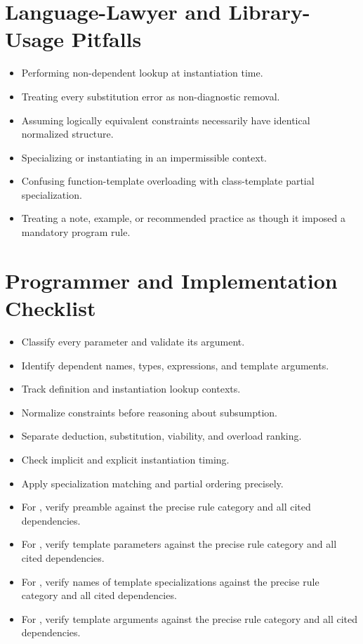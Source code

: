 \documentclass[11pt,letterpaper]{article}
\begin{document}
\section{Language-Lawyer and Library-Usage Pitfalls}
\begin{CornellReferencePitfallBox}\begin{itemize}[label=\textcolor{CornellReferenceAmber}{$\blacktriangleright$}]
\item Performing non-dependent lookup at instantiation time.
\item Treating every substitution error as non-diagnostic removal.
\item Assuming logically equivalent constraints necessarily have identical normalized structure.
\item Specializing or instantiating in an impermissible context.
\item Confusing function-template overloading with class-template partial specialization.
\item Treating a note, example, or recommended practice as though it imposed a mandatory program rule.
\end{itemize}\end{CornellReferencePitfallBox}
\section{Programmer and Implementation Checklist}
\begin{CornellReferenceChecklistBox}\begin{itemize}[label=$\square$]
\item Classify every parameter and validate its argument.
\item Identify dependent names, types, expressions, and template arguments.
\item Track definition and instantiation lookup contexts.
\item Normalize constraints before reasoning about subsumption.
\item Separate deduction, substitution, viability, and overload ranking.
\item Check implicit and explicit instantiation timing.
\item Apply specialization matching and partial ordering precisely.
\item For , verify preamble against the precise rule category and all cited dependencies.
\item For , verify template parameters against the precise rule category and all cited dependencies.
\item For , verify names of template specializations against the precise rule category and all cited dependencies.
\item For , verify template arguments against the precise rule category and all cited dependencies.
\end{itemize}\end{CornellReferenceChecklistBox}
\end{document}
